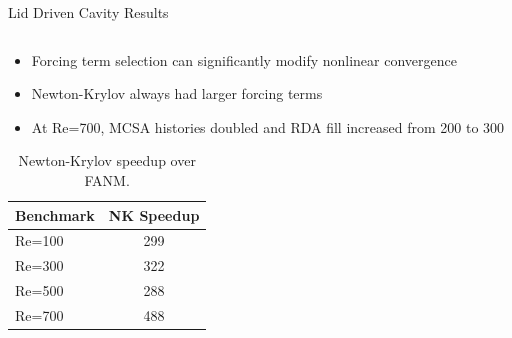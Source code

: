 \documentclass{beamer}
\begin{document}
\begin{frame}{Lid Driven Cavity Results}
\begin{columns}
    \begin{column}{0.4\textwidth}

      \small{
        \begin{itemize}
        \item Forcing term selection can significantly modify nonlinear
          convergence
        \item Newton-Krylov always had larger forcing terms
        \item At Re=700, MCSA histories doubled and RDA fill increased
          from 200 to 300
        \end{itemize}
      }

      \smallskip

      \tiny{
        \begin{table}[h!]
          \begin{center}
            \begin{tabular}{lc}\hline\hline
              \multicolumn{1}{l}{Benchmark}& 
              \multicolumn{1}{c}{NK Speedup}\\
              \hline
              Re=100 & 299 \\
              Re=300 & 322 \\
              Re=500 & 288 \\
              Re=700 & 488 \\
              \hline\hline
            \end{tabular}
          \end{center}
          \caption{Newton-Krylov speedup over FANM.}
        \end{table}
      }

    \end{column}
  \end{columns}

\end{frame}
\end{document}
